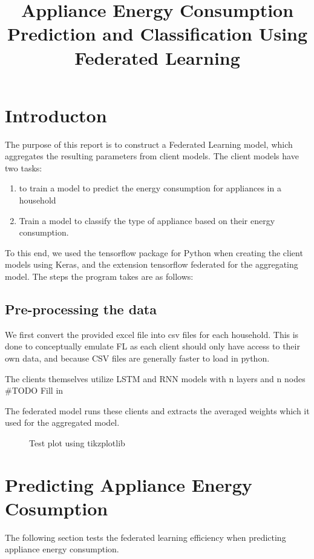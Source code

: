\documentclass[a4paper, article, oneside, USenglish, IN5460]{memoir}
\title{Appliance Energy Consumption Prediction and Classification Using Federated Learning}
\begin{document}
\projectfrontpage


\chapter{Introducton}

The purpose of this report is to construct a Federated Learning model, which aggregates the resulting parameters from client models. The client models have two tasks:
\begin{enumerate}
    \item to train a model to predict the energy consumption for appliances in a household
    \item Train a model to classify the type of appliance based on their energy consumption.    
\end{enumerate}

To this end, we used the tensorflow package for Python when creating the client models using Keras, and the extension tensorflow federated for the aggregating model. The steps the program takes are as follows:


\section{Pre-processing the data}
We first convert the provided excel file into csv files for each household. This is done to conceptually emulate FL as each client should only have access to their own data, and because CSV files are generally faster to load in python.

The clients themselves utilize LSTM and RNN models with n layers and n nodes #TODO Fill in

The federated model runs these clients and extracts the averaged weights which it used for the aggregated model.



\begin{figure}[h]
  \centering
    
  \caption{Test plot using tikzplotlib}
\end{figure}



\chapter{Predicting Appliance Energy Cosumption}

The following section tests the federated learning efficiency when predicting appliance energy consumption.
\end{document}
